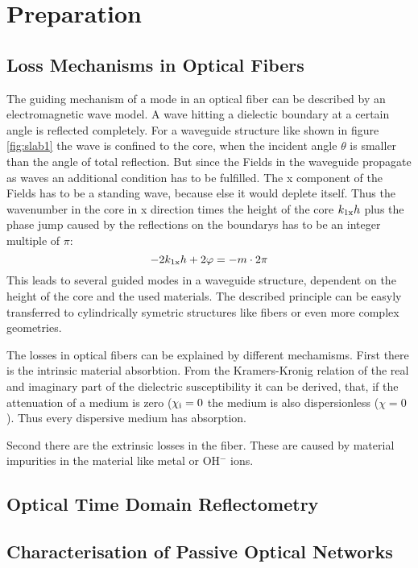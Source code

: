 \chapter{Preparation}
\section{Loss Mechanisms in Optical Fibers}

The guiding mechanism of a mode in an optical fiber can be described by an electromagnetic wave model. A wave hitting a dielectic boundary at a certain angle is reflected completely. For a waveguide structure like shown in figure \ref{fig:slab1} the wave is confined to the core, when the incident angle $\theta$ is smaller than the angle of total reflection. But since the Fields in the waveguide propagate as waves an additional condition has to be fulfilled. The x component of the Fields has to be a standing wave, because else it would deplete itself. Thus the wavenumber in the core in x direction times the height of the core $k_{\mathrm{1x}}h$ plus the phase jump caused by the reflections on the boundarys has to be an integer multiple of $\pi$:
\begin{equation}
 -2k_{\mathrm{1x}}h+2\varphi = -m\cdot2\pi
\end{equation}
This leads to several guided modes in a waveguide structure, dependent on the height of the core and the used materials. The described principle can be easyly transferred to cylindrically symetric structures like fibers or even more complex geometries.

The losses in optical fibers can be explained by different mechamisms. First there is the intrinsic material absorbtion. From the Kramers-Kronig relation of the real and imaginary part of the dielectric susceptibility it can be derived, that, if the attenuation of a medium is zero ($\chi_{\mathrm{i}}=0$ the medium is also dispersionless ($\chi=0$). Thus every dispersive medium has absorption.

Second there are the extrinsic losses in the fiber. These are caused by material impurities in the material like metal or OH$^-$ ions.



\section{Optical Time Domain Reflectometry}

\section{Characterisation of Passive Optical Networks}